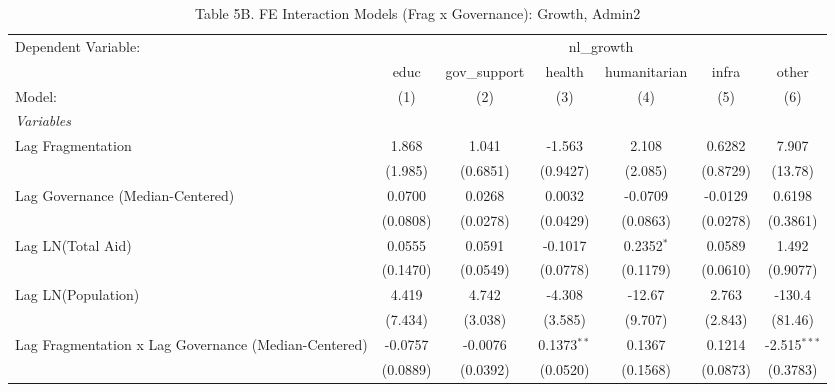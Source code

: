\begin{table}[H]
   \caption{Table 5B. FE Interaction Models (Frag x Governance): Growth, Admin2}
   \centering
   \begin{tabular}{lcccccc}
      \tabularnewline \midrule \midrule
      Dependent Variable: & \multicolumn{6}{c}{nl\_growth}\\
                                                           & educ     & gov\_support  & health        & humanitarian & infra    & other \\   
      Model:                                               & (1)      & (2)           & (3)           & (4)          & (5)      & (6)\\  
      \midrule
      \emph{Variables}\\
      Lag Fragmentation                                    & 1.868    & 1.041         & -1.563        & 2.108        & 0.6282   & 7.907\\   
                                                           & (1.985)  & (0.6851)      & (0.9427)      & (2.085)      & (0.8729) & (13.78)\\   
      Lag Governance (Median-Centered)                     & 0.0700   & 0.0268        & 0.0032        & -0.0709      & -0.0129  & 0.6198\\   
                                                           & (0.0808) & (0.0278)      & (0.0429)      & (0.0863)     & (0.0278) & (0.3861)\\   
      Lag LN(Total Aid)                                    & 0.0555   & 0.0591        & -0.1017       & 0.2352$^{*}$ & 0.0589   & 1.492\\   
                                                           & (0.1470) & (0.0549)      & (0.0778)      & (0.1179)     & (0.0610) & (0.9077)\\   
      Lag LN(Population)                                   & 4.419    & 4.742         & -4.308        & -12.67       & 2.763    & -130.4\\   
                                                           & (7.434)  & (3.038)       & (3.585)       & (9.707)      & (2.843)  & (81.46)\\   
      Lag Fragmentation x Lag Governance (Median-Centered) & -0.0757  & -0.0076       & 0.1373$^{**}$ & 0.1367       & 0.1214   & -2.515$^{***}$\\   
                                                           & (0.0889) & (0.0392)      & (0.0520)      & (0.1568)     & (0.0873) & (0.3783)\\   

\end{tabular}
\end{table}
